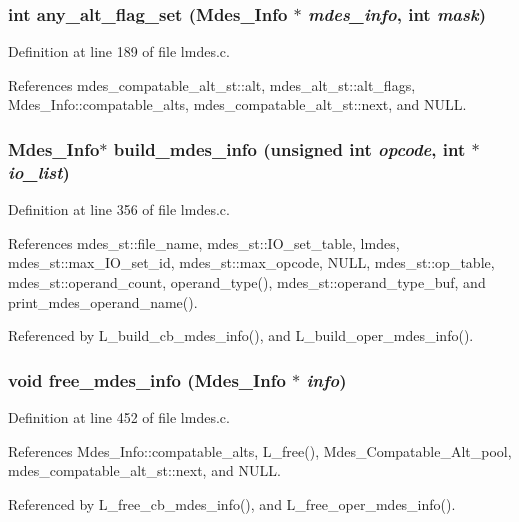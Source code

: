 \subsubsection{\setlength{\rightskip}{0pt plus 5cm}int any\_\-alt\_\-flag\_\-set (\bf{Mdes\_\-Info} $\ast$ {\em mdes\_\-info}, int {\em mask})}\label{lmdes_8h_9605b95ef76210011ca535870490cd9a}




Definition at line 189 of file lmdes.c.

References mdes\_\-compatable\_\-alt\_\-st::alt, mdes\_\-alt\_\-st::alt\_\-flags, Mdes\_\-Info::compatable\_\-alts, mdes\_\-compatable\_\-alt\_\-st::next, and NULL.
\subsubsection{\setlength{\rightskip}{0pt plus 5cm}\bf{Mdes\_\-Info}$\ast$ build\_\-mdes\_\-info (unsigned int {\em opcode}, int $\ast$ {\em io\_\-list})}\label{lmdes_8h_e14f6808b51ea8eeb57db97bb06a5fc3}




Definition at line 356 of file lmdes.c.

References mdes\_\-st::file\_\-name, mdes\_\-st::IO\_\-set\_\-table, lmdes, mdes\_\-st::max\_\-IO\_\-set\_\-id, mdes\_\-st::max\_\-opcode, NULL, mdes\_\-st::op\_\-table, mdes\_\-st::operand\_\-count, operand\_\-type(), mdes\_\-st::operand\_\-type\_\-buf, and print\_\-mdes\_\-operand\_\-name().

Referenced by L\_\-build\_\-cb\_\-mdes\_\-info(), and L\_\-build\_\-oper\_\-mdes\_\-info().
\subsubsection{\setlength{\rightskip}{0pt plus 5cm}void free\_\-mdes\_\-info (\bf{Mdes\_\-Info} $\ast$ {\em info})}\label{lmdes_8h_3e2b7abcf414fa5c31b177b5fa743192}




Definition at line 452 of file lmdes.c.

References Mdes\_\-Info::compatable\_\-alts, L\_\-free(), Mdes\_\-Compatable\_\-Alt\_\-pool, mdes\_\-compatable\_\-alt\_\-st::next, and NULL.

Referenced by L\_\-free\_\-cb\_\-mdes\_\-info(), and L\_\-free\_\-oper\_\-mdes\_\-info().
